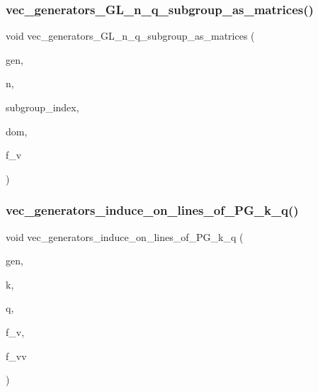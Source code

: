 \subsubsection{\texorpdfstring{vec\+\_\+generators\+\_\+\+G\+L\+\_\+n\+\_\+q\+\_\+subgroup\+\_\+as\+\_\+matrices()}{vec\_generators\_GL\_n\_q\_subgroup\_as\_matrices()}}
{\footnotesize\ttfamily void vec\+\_\+generators\+\_\+\+G\+L\+\_\+n\+\_\+q\+\_\+subgroup\+\_\+as\+\_\+matrices (\begin{DoxyParamCaption}\item[{\mbox{\hyperlink{class_vector}{Vector}} \&}]{gen,  }\item[{\mbox{\hyperlink{galois_8h_a09fddde158a3a20bd2dcadb609de11dc}{I\+NT}}}]{n,  }\item[{\mbox{\hyperlink{galois_8h_a09fddde158a3a20bd2dcadb609de11dc}{I\+NT}}}]{subgroup\+\_\+index,  }\item[{\mbox{\hyperlink{classdomain}{domain}} $\ast$}]{dom,  }\item[{\mbox{\hyperlink{galois_8h_a09fddde158a3a20bd2dcadb609de11dc}{I\+NT}}}]{f\+\_\+v }\end{DoxyParamCaption})}

\mbox{\label{perm__group__gens_8_c_ab33fa2e167b2501e5761fee699b4c285}} 
\subsubsection{\texorpdfstring{vec\+\_\+generators\+\_\+induce\+\_\+on\+\_\+lines\+\_\+of\+\_\+\+P\+G\+\_\+k\+\_\+q()}{vec\_generators\_induce\_on\_lines\_of\_PG\_k\_q()}}
{\footnotesize\ttfamily void vec\+\_\+generators\+\_\+induce\+\_\+on\+\_\+lines\+\_\+of\+\_\+\+P\+G\+\_\+k\+\_\+q (\begin{DoxyParamCaption}\item[{\mbox{\hyperlink{class_vector}{Vector}} \&}]{gen,  }\item[{\mbox{\hyperlink{galois_8h_a09fddde158a3a20bd2dcadb609de11dc}{I\+NT}}}]{k,  }\item[{\mbox{\hyperlink{galois_8h_a09fddde158a3a20bd2dcadb609de11dc}{I\+NT}}}]{q,  }\item[{\mbox{\hyperlink{galois_8h_a09fddde158a3a20bd2dcadb609de11dc}{I\+NT}}}]{f\+\_\+v,  }\item[{\mbox{\hyperlink{galois_8h_a09fddde158a3a20bd2dcadb609de11dc}{I\+NT}}}]{f\+\_\+vv }\end{DoxyParamCaption})}

